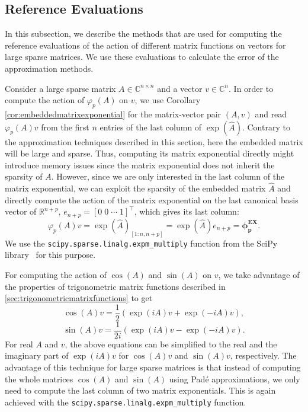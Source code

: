 \subsection{Reference Evaluations}
\label{sec:exactevaluation}

In this subsection, we describe the methods that are used for computing the reference
evaluations of the action of different matrix functions on vectors for large sparse matrices.
We use these evaluations to calculate the error of the approximation methods.

Consider a large sparse matrix $A \in \mathbb{C}^{n \times n}$ and a vector $v \in \mathbb{C}^n$.
In order to compute the action of $\varphi_p(A)$ on $v$, we use Corollary
\ref{cor:embeddedmatrixexponential} for the matrix-vector pair $(A, v)$ and
read $\varphi_p(A) v$ from the first $n$ entries of the last column of $\exp(\hat{A})$.
Contrary to the approximation techniques described in this section, here the embedded
matrix will be large and sparse.
Thus, computing its matrix exponential directly might introduce memory issues
since the matrix exponential does not inherit the sparsity of $A$.
However, since we are only interested in the last column of the matrix exponential,
we can exploit the sparsity of the embedded matrix $\hat{A}$ and directly compute
the action of the matrix exponential on the last canonical basis vector of $\mathbb{R}^{n+p}$,
$e_{n+p} = [0\;0\;\cdots\;1]^\top$, which gives its last column:
\begin{equation*}
    \varphi_p(A) v = \exp(\hat{A})_{[1 : n, n+p]} = \exp(\hat{A}) e_{n+p} = \mathbf{\phi_{p}^{EX}}.
\end{equation*}
We use the \texttt{scipy.sparse.linalg.expm\_multiply} function from
the SciPy library~\cite{SciPy2020} for this purpose.

For computing the action of $\cos(A)$ and $\sin(A)$ on $v$, we take advantage of the properties
of trigonometric matrix functions described in \autoref{sec:trigonometricmatrixfunctions} to get
\begin{equation*}
        \cos(A) v = \frac{1}{2}(\exp(iA)v + \exp(-iA)v),
\end{equation*}
\begin{equation*}
        \sin(A) v = \frac{1}{2i}(\exp(iA)v - \exp(-iA)v).
\end{equation*}
For real $A$ and $v$, the above equations can be simplified to the real and
the imaginary part of $\exp(iA)v$ for $\cos(A)v$ and $\sin(A)v$,
respectively.
The advantage of this technique for large sparse matrices is that instead of computing
the whole matrices $\cos(A)$ and $\sin(A)$ using Padé approximations, we only need to
compute the last column of two matrix exponentials. This is again achieved with the
\texttt{scipy.sparse.linalg.expm\_multiply} function.

